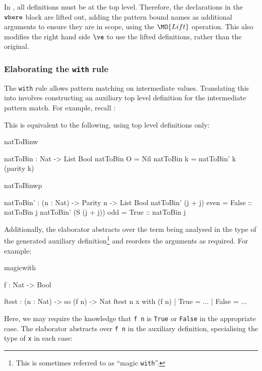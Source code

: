 In \TT{}, all definitions must be at the top level. Therefore, the declarations 
in the $\mathtt{where}$ block are lifted out, adding the pattern bound names as additional arguments
to ensure they are in scope, using the $\MO{Lift}$ operation. This also modifies
the right hand side $\ve$ to use the lifted definitions, rather than the original.

\subsubsection{Elaborating the \texttt{with} rule}

The \texttt{with} rule allows  pattern matching on intermediate values.
Translating this into \TT{} involves constructing an auxiliary top level
definition for 
the intermediate pattern match. For example, recall :


\noindent
This is equivalent to the following, using top level definitions only:

\begin{SaveVerbatim}{natToBinw}

natToBin : Nat -> List Bool
natToBin O = Nil
natToBin k = natToBin' k (parity k)

\end{SaveVerbatim}
\begin{SaveVerbatim}{natToBinwp}

natToBin' : (n : Nat) -> Parity n -> List Bool
natToBin' (j + j)     even = False :: natToBin j
natToBin' (S (j + j)) odd  = True  :: natToBin j

\end{SaveVerbatim}


\noindent
Additionally, the elaborator abstracts over the term being analysed in the type
of the generated auxiliary definition\footnote{This is sometimes referred to
as ``magic \texttt{with}''.} and reorders the arguments as required.
For example:

\begin{SaveVerbatim}{magicwith}

f : Nat -> Bool

ftest : (n : Nat) -> so (f n) -> Nat
ftest n x with (f n)
     | True  = ...
     | False = ...

\end{SaveVerbatim}

\noindent
Here, we may require the knowledge that \texttt{f n} is \texttt{True} or
\texttt{False} in the appropriate case. The elaborator abstracts over
\texttt{f n} in the auxiliary definition, specialising the type of
\texttt{x} in each case:

